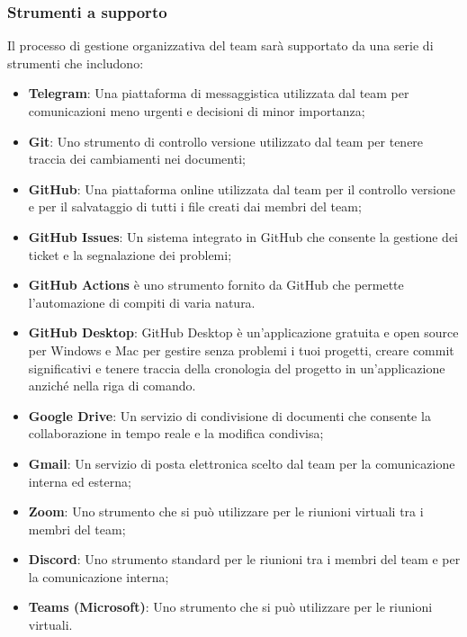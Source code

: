 \subsubsection{Strumenti a supporto}
Il processo di gestione organizzativa del team sarà supportato da una serie di strumenti che includono:
\begin{itemize}
    \item \textbf{Telegram\glo}: Una piattaforma di messaggistica utilizzata dal team per comunicazioni meno urgenti e decisioni di minor importanza;
    \item \textbf{Git\glo}: Uno strumento di controllo versione utilizzato dal team per tenere traccia dei cambiamenti nei documenti;
    \item \textbf{GitHub\glo}: Una piattaforma online utilizzata dal team per il controllo versione e per il salvataggio di tutti i file creati dai membri del team;
    \item \textbf{GitHub Issues\glo}: Un sistema integrato in GitHub che consente la gestione dei ticket e la segnalazione dei problemi;
    \item \textbf{GitHub Actions\glo} è uno strumento fornito da GitHub che permette l’automazione di compiti di varia natura.
    \item \textbf{GitHub Desktop\glo}: GitHub Desktop è un'applicazione gratuita e open source per Windows e Mac per gestire senza problemi i tuoi progetti, creare commit significativi e tenere traccia della cronologia del progetto in un'applicazione anziché nella riga di comando.
    \item \textbf{Google Drive\glo}: Un servizio di condivisione di documenti che consente la collaborazione in tempo reale e la modifica condivisa;
    \item \textbf{Gmail\glo}: Un servizio di posta elettronica scelto dal team per la comunicazione interna ed esterna;
    \item \textbf{Zoom\glo}: Uno strumento che si può utilizzare per le riunioni virtuali tra i membri del team;
    \item \textbf{Discord\glo}: Uno strumento standard per le riunioni tra i membri del team e per la comunicazione interna;
    \item \textbf{Teams (Microsoft)\glo}: Uno strumento che si può utilizzare per le riunioni virtuali.
\end{itemize}
